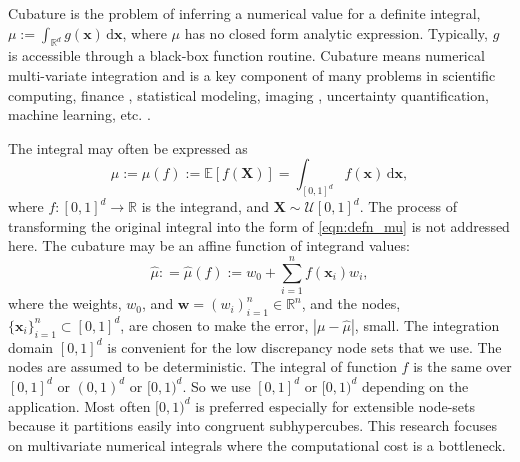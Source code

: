 \documentclass{iitthesis}          %
\newcommand{\bm}[1]{\boldsymbol{#1}}
\newcommand{\dif}[1]{\text{d}{#1}}
\newcommand{\reals}{\mathbb{R}}
\newcommand{\Ex}{\mathbb{E}}
\newcommand{\vw}{\bm{w}}
\newcommand{\vx}{\bm{x}}
\newcommand{\dvx}{\dif{\bm{x}}}
\newcommand{\hmu}{\widehat{\mu}}
\def\abs#1{\ensuremath{\left \lvert #1 \right \rvert}}
\newcommand{\JRNote}[1]{}
\begin{document}
\textpages     %




\label{intro}

Cubature is the problem of inferring a numerical value for a definite integral, 
$ \mu := \int_{\reals^d} g(\vx) \, \dif \vx$, where $\mu$ has no closed form analytic expression. Typically, $g$ is accessible through a black-box function routine. 
Cubature means numerical multi-variate integration and is a key component of many problems in scientific computing, finance \cite{Gla03}, statistical modeling, imaging \cite{Keller2013}, uncertainty quantification, machine learning, etc. \cite{Goodfellow-et-al-2016}.

The integral may often be expressed as
\begin{equation}
\label{eqn:defn_mu}
\mu:= \mu(f) := \Ex[f(\boldsymbol{X})] = \int_{[0,1]^d} f(\vx)\, \dvx, 
\end{equation}
where $f:[0,1]^d \to \reals$ is the integrand, and $\boldsymbol{X} \sim \mathcal{U}[0,1]^d$.  The process of transforming the original integral into the form of \eqref{eqn:defn_mu}  is not addressed here.  The cubature may be an affine function of integrand values:
\begin{equation}
\label{eqn:defn_hmu}  %
\hmu: = \hmu(f) := w_0 + \sum_{i=1}^{n} f(\vx_i) w_i,
\end{equation}
where the weights, $w_0$, and  $\vw = (w_i)_{i=1}^n \in \reals^n$, and the nodes, $\{\vx_i\}_{i=1}^n \subset [0,1]^d$, are chosen to make the error, $\abs{\mu - \hmu}$, small. The integration domain $[0,1]^d$ is convenient for the low discrepancy node sets that we use.  The nodes are assumed to be deterministic.
The integral of function $f$ is the same over $[0, 1]^d$ or $(0, 1)^d$ or $[0, 1)^d$. So we use $[0, 1]^d$ or $[0, 1)^d$ depending on the application. Most often $[0, 1)^d$ is preferred especially for extensible node-sets because  it partitions easily into congruent subhypercubes.
This research focuses on multivariate numerical integrals where the computational cost is a bottleneck. %

\end{document}
